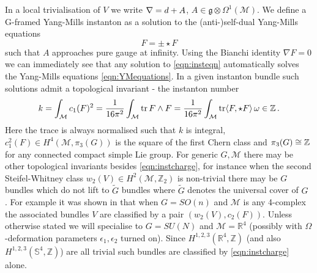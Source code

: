 \documentclass[main.tex]{subfiles}
\begin{document}
In a local trivialisation of $V$ we write $\nabla=d+A$, $A\in \mathfrak{g}\otimes \Omega^1(\mathcal{M})$.  We define a G-framed Yang-Mills instanton as a solution to the (anti-)self-dual Yang-Mills equations 
\begin{equation}\label{eqn:insteqn}
F=\pm\star F
\end{equation}
such that $A$ approaches pure gauge at infinity. Using the Bianchi identity $\nabla F=0$ we can immediately see that any solution to \eqref{eqn:insteqn} automatically solves the Yang-Mills equations \eqref{eqn:YMequations}. In a given instanton bundle such solutions admit a topological invariant - the instanton number 
\begin{equation}\label{eqn:instcharge}
k=\int_{\mathcal{M}}c_1(F)^2=\frac{1}{16\pi^2}\int_{\mathcal{M}}\operatorname{tr} F\wedge F=\frac{1}{16\pi^2}\int_{\mathcal{M}}\operatorname{tr} \langle F,\star F\rangle\,\omega\in\mathbb{Z}\,.
\end{equation}
Here the trace is always normalised such that $k$ is integral, $c_1^2(F)\in H^4(\mathcal{M},\pi_3(G))$ is the square of the first Chern class and $\pi_3(G)\cong\mathbb{Z}$ for any connected compact simple Lie group.  For generic $G,\mathcal{M}$ there may be other topological invariants besides \eqref{eqn:instcharge}, for instance when the second Steifel-Whitney class $w_2(V)\in H^2(\mathcal{M},\mathbb{Z}_2)$ is non-trivial there may be $G$ bundles which do not lift to $\widetilde{G}$ bundles where $\widetilde{G}$ denotes the universal cover of $G$ \cite{Aharony:2013hda}.  For example it was shown in \cite{doldclassification} that when $G=SO(n)$ and $\mathcal{M}$ is any 4-complex the associated bundles $V$ are classified by a pair $(w_2(V),c_2(F))$.  Unless otherwise stated we will specialise to $G=SU(N)$ and $\mathcal{M}=\mathbb{R}^4$ (possibly with $\Omega$-deformation parameters $\epsilon_1,\epsilon_2$ turned on).  Since $ H^{1,2,3}(\mathbb{R}^4,\mathbb{Z})$ (and also $ H^{1,2,3}(\mathbb{S}^4,\mathbb{Z})$) are all trivial such bundles are classified by \eqref{eqn:instcharge} alone.
\end{document}
